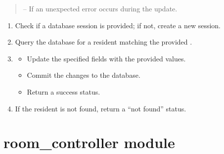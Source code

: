 \documentclass[letterpaper,10pt,english]{sphinxmanual}
\begin{document}
\begin{fulllineitems}
\begin{fulllineitems}
\begin{quote}
\begin{description}
\sphinxAtStartPar
{} – If an unexpected error occurs during the update.

\end{description}\end{quote}
\begin{description}
\begin{enumerate}
%
\item {} 
\sphinxAtStartPar
Check if a database session is provided; if not, create a new session.

\item {} 
\sphinxAtStartPar
Query the database for a resident matching the provided .

\item {} \begin{description}
\begin{itemize}
\item {} 
\sphinxAtStartPar
Update the specified fields with the provided values.

\item {} 
\sphinxAtStartPar
Commit the changes to the database.

\item {} 
\sphinxAtStartPar
Return a success status.

\end{itemize}

\end{description}

\item {} 
\sphinxAtStartPar
If the resident is not found, return a “not found” status.

\end{enumerate}

\end{description}

\end{fulllineitems}


\end{fulllineitems}



\section{room\_controller module}
\label{\detokenize{app.controllers:module-app.controllers.room_controller}}\label{\detokenize{app.controllers:room-controller-module}}
\end{document}

